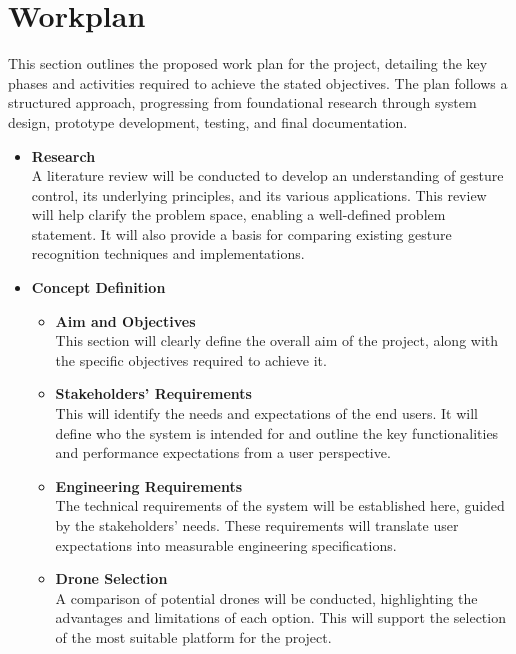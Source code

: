 \chapter{Workplan}
This section outlines the proposed work plan for the project, detailing the key phases and activities required to achieve the stated objectives. The plan follows a structured approach, progressing from foundational research through system design, prototype development, testing, and final documentation.

\begin{itemize}

\item \textbf{Research} \\
A literature review will be conducted to develop an understanding of gesture control, its underlying principles, and its various applications. This review will help clarify the problem space, enabling a well-defined problem statement. It will also provide a basis for comparing existing gesture recognition techniques and implementations.

\item \textbf{Concept Definition}
\begin{itemize}
    \item \textbf{Aim and Objectives} \\
    This section will clearly define the overall aim of the project, along with the specific objectives required to achieve it.

    \item \textbf{Stakeholders’ Requirements} \\
    This will identify the needs and expectations of the end users. It will define who the system is intended for and outline the key functionalities and performance expectations from a user perspective.

    \item \textbf{Engineering Requirements} \\
    The technical requirements of the system will be established here, guided by the stakeholders’ needs. These requirements will translate user expectations into measurable engineering specifications.

    \item \textbf{Drone Selection} \\
    A comparison of potential drones will be conducted, highlighting the advantages and limitations of each option. This will support the selection of the most suitable platform for the project.
\end{itemize}


\end{itemize}
